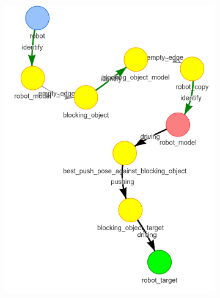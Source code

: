 \begin{figure}[H]
  \centering
  \begin{subfigure}{.3\textwidth}
    \centering
  \includegraphics[width=\textwidth]{figures/proposed_method/connecting_nodes/blocking_obj/blocking_obj_5}
    \caption{}\label{subfig:blocking_obj_5}
  \end{subfigure}
  \begin{subfigure}{.3\textwidth}
    \centering

\end{subfigure}
\end{figure}

